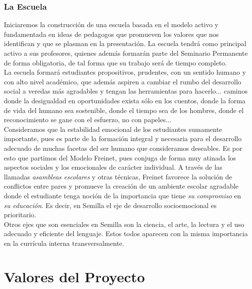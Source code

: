 \documentclass[10pt,letterpaper,oneside]{book}
\begin{document}
\subsection{La Escuela}
Iniciaremos la construcción de una escuela basada en el modelo activo y fundamentada en ideas de pedagogos que promueven los valores que nos identifican y que se plasman en la presentación. La escuela tendrá como principal activo  a sus profesores, quienes además formarán parte del Seminario Permanente de forma obligatoria, de tal forma que su trabajo será de tiempo completo.\\

La escuela formará estudiantes propositivos, prudentes, con un sentido humano y con alto nivel académico, que además aspiren a cambiar el rumbo del desarrollo social a veredas más agradables y tengan las herramientas para hacerlo... caminos donde la desigualdad en oportunidades exista sólo en los cuentos, donde la forma de vida del humano sea sostenible, donde el tiempo sea de los hombres, donde el reconocimiento se gane con el esfuerzo, no con papeles...\\

Consideramos que la estabilidad emocional de los estudiantes sumamente importante, pues es parte de la formación integral y necesaria para el  desarrollo adecuado de muchas facetas del ser humano que consideramos deseables. Es por esto que partimos del Modelo Freinet, pues conjuga de forma muy atinada los aspectos sociales y los emocionales de carácter individual. A través de las llamadas \emph{asambleas escolares} y otras técnicas, Freinet favorece la solución de conflictos entre pares y promueve la creación de un ambiente escolar agradable donde el estudiante tenga noción de la importancia que tiene \emph{su compromiso} en \emph{su educación}. Es decir, en Semilla el eje de desarrollo socioemocional es prioritario.\\

Otros ejes que son esenciales en Semilla son la ciencia, el arte, la lectura y el uso adecuado y eficiente del lenguaje. Estos todos aparecen con la misma importancia en la currícula interna transversalmente.


\chapter{Valores del Proyecto}
\end{document}
